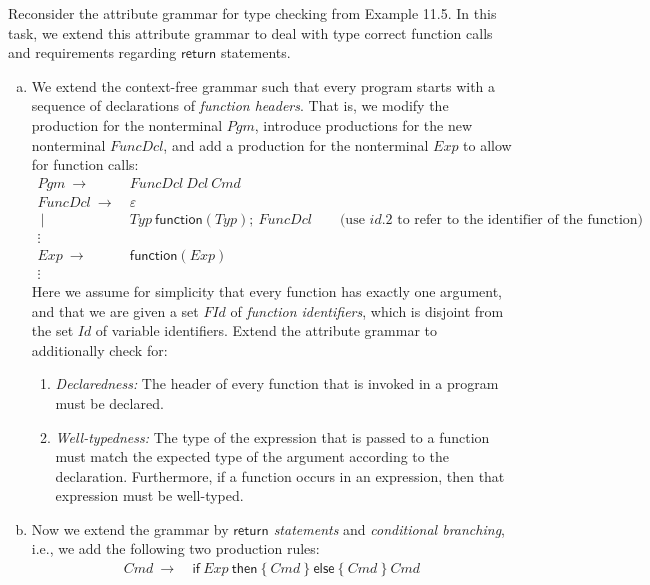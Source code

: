\newcommand{\ret}{\textsf{return}}
\newcommand{\FId}{F\!I\!d}
\newcommand{\Id}{I\!d}
\begin{exercise}{30}	
Reconsider the attribute grammar for type checking from Example 11.5. In this task, we extend this attribute grammar to deal with type correct function calls and requirements regarding $\ret$ statements.

\begin{enumerate}[(a)]
	\item We extend the context-free grammar such that every program starts with a sequence of declarations of \emph{function headers}.
	That is, we modify the production for the nonterminal $Pgm$, introduce productions for the new nonterminal $FuncDcl$, and add a production for the nonterminal $Exp$ to allow for function calls:
	\begin{align*}
	     Pgm  ~{}\rightarrow {}~& FuncDcl~Dcl~Cmd \\
	     FuncDcl  ~{}\rightarrow~{} & \varepsilon \\
	     ~{}\mid{}~& Typ~\textsf{function}(Typ);~ FuncDcl \qquad \text{(use $id.2$ to refer to the identifier of the function)} \\
	     \vdots& \\
	      Exp  ~{}\rightarrow~{} & \textsf{function}(Exp) \\
	      \vdots&
	\end{align*}
	Here we assume for simplicity that every function has exactly one argument, and that we are given a set $\FId$ of \emph{function identifiers}, which is disjoint from the set $\Id$ of variable identifiers. Extend the attribute grammar to additionally check for:
	\begin{enumerate}
	   \item \emph{Declaredness:} The header of every function that is invoked in a program must be declared.
	   \item \emph{Well-typedness:} The type of the expression that is passed to a function must match the expected type of the argument according to the declaration. Furthermore, if a function occurs in an expression, then that expression must be well-typed.
	\end{enumerate}
	\item Now we extend the grammar by \emph{$\ret$ statements} and \emph{conditional branching}, i.e., we add the following two production rules:
	\begin{align*}
	    Cmd  ~{}\rightarrow~{} & \textsf{if}~ Exp~ \textsf{then}~ \{~ Cmd~ \}~ \textsf{else}~ \{~ Cmd~ \}~ Cmd\\

\end{align*}
\end{enumerate}
\end{exercise}
